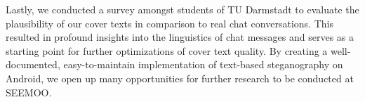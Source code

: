Lastly, we conducted a survey amongst students of TU Darmstadt to evaluate the plausibility of our cover texts in comparison to real chat conversations. This resulted in profound insights into the linguistics of chat messages and serves as a starting point for further optimizations of cover text quality. By creating a well-documented, easy-to-maintain implementation of text-based steganography on Android, we open up many opportunities for further research to be conducted at SEEMOO.
